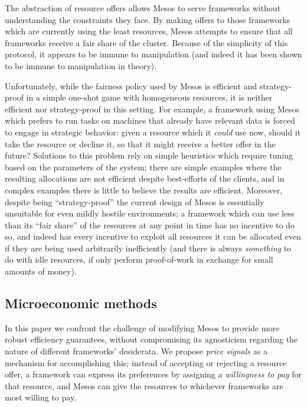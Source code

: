\documentclass{acm_proc_article-sp}
\begin{document}
The abstraction of resource offers allows Mesos to serve frameworks without
understanding the constraints they face. By making offers to those frameworks
which are currently using the least resources, Mesos attempts to ensure that all
frameworks receive a fair share of the cluster. Because of the simplicity of
this protocol, it appears to be immune to manipulation (and indeed it has been
shown to be immune to manipulation in theory).

Unfortunately, while the fairness policy used by Mesos is efficient and
strategy-proof in a simple one-shot game with homogeneous resources, it is
neither efficient nor strategy-proof in this setting. For example, a framework
using Mesos which prefers to run tasks on machines that already have relevant
data is forced to engage in strategic behavior: given a resource which it
\emph{could} use now, should it take the resource or decline it, so that it
might receive a better offer in the future? Solutions to this problem rely on
simple heuristics which require tuning based on the parameters of the system;
there are simple examples where the resulting allocations are not efficient
despite best-efforts of the clients, and in complex examples there is little to
believe the results are efficient. Moreover, despite being ``strategy-proof'' the
current design of Mesos is essentially unsuitable for even mildly hostile
environments; a framework which can use less than its ``fair share'' of the
resources at any point in time has no incentive to do so, and indeed has every
incentive to exploit all resources it can be allocated even if they are being
used arbitrarily inefficiently (and there is always \emph{something} to do with
idle resources, if only perform proof-of-work in exchange for small amounts of
money).

\subsection{Microeconomic methods}
In this paper we confront the challenge of modifying Mesos to provide more
robust efficiency guarantees, without compromising its agnosticism regarding the
nature of different frameworks’ desiderata. We propose \emph{price signals} as a
mechanism for accomplishing this; instead of accepting or rejecting a resource
offer, a framework can express its preferences by assigning a \emph{willingness
to pay} for that resource, and Mesos can give the resources to whichever
frameworks are most willing to pay.
\end{document}
